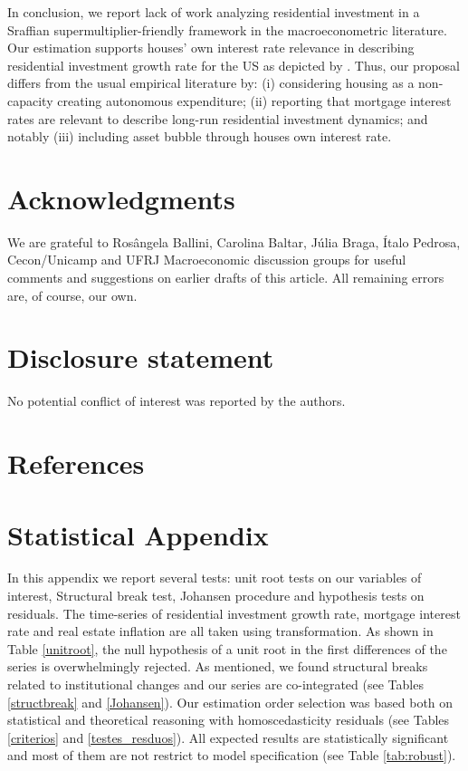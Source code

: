 \documentclass[11pt]{article}
\begin{document}
In conclusion,  we report lack of work analyzing residential investment in a Sraffian supermultiplier-friendly framework in the macroeconometric literature.
Our estimation supports houses' own interest rate relevance in describing residential investment growth rate for the US as depicted by \textcite{teixeira_crescimento_2015}.
Thus, our  proposal differs from the usual empirical literature by:
	(i) considering housing as a non-capacity creating autonomous expenditure;
	(ii) reporting that mortgage interest rates are relevant to describe long-run residential investment dynamics; and notably 
	(iii) including asset bubble through houses own interest rate.


\section*{Acknowledgments}
\label{sec:org2e50caa}
\noindent We are grateful to Rosângela Ballini, Carolina Baltar, Júlia Braga, Ítalo Pedrosa, Cecon/Unicamp and UFRJ Macroeconomic discussion groups for useful comments and suggestions on earlier drafts of this article. All remaining errors are, of course, our own.


\section*{Disclosure statement}
\label{sec:orgbc26f07}
No potential conflict of interest was reported by the authors.

\section*{References}
\label{sec:org179641c}
\printbibliography[heading=none]


\appendix
\section{Statistical Appendix}
\label{sec:org43b6350}
\label{appen:A}

In this appendix we report several tests: unit root tests on our variables of interest, Structural break test, Johansen procedure and hypothesis tests on residuals. 
The time-series of residential investment growth rate, mortgage interest rate and real estate inflation are all taken using \textcite{yeo_new_2000} transformation.  
As shown in Table \ref{unitroot}, the null hypothesis of a unit root in the first differences of the series is overwhelmingly rejected.
As mentioned, we found structural breaks related to institutional changes and our series are co-integrated (see Tables \ref{structbreak} and \ref{Johansen}).
Our estimation order selection was based both on statistical and theoretical reasoning with homoscedasticity residuals (see Tables \ref{criterios} and \ref{testes_resduos}).
All expected results are statistically significant and most of them are not restrict to model specification (see Table \ref{tab:robust}).







\end{document}
